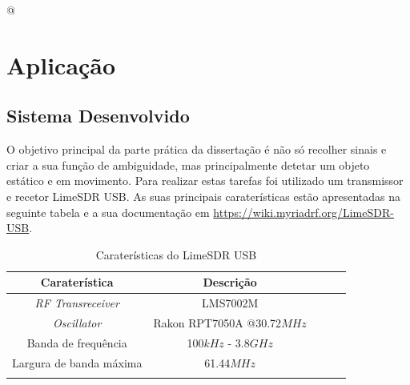 @%

\chapter{Aplicação} %
\label{chap:Chapter5} %

\section{Sistema Desenvolvido}
O objetivo principal da parte prática da dissertação é não só recolher sinais e criar a sua função de ambiguidade, mas principalmente detetar um objeto estático e em movimento.
Para realizar estas tarefas foi utilizado um transmissor e recetor LimeSDR USB. As suas principais caraterísticas estão apresentadas na seguinte tabela e a sua documentação em \url{https://wiki.myriadrf.org/LimeSDR-USB}.\par

\begin{table}[h]
\centering
\begin{tabular}{@{}ccccc@{}}
\toprule
Caraterística       			 & Descrição                      \\ \midrule
\textit{RF Transreceiver}        & LMS7002M                       \\
\textit{Oscillator}    			 & Rakon RPT7050A @30.72$MHz$    \\
Banda de frequência              & 100$kHz$ - 3.8$GHz$            \\ 
Largura de banda máxima          & 61.44$MHz$                     \\ \bottomrule
\label{tab:limesdr}
\end{tabular}
\caption[Caraterísticas do LimeSDR USB]{Caraterísticas do LimeSDR USB}
\end{table}

